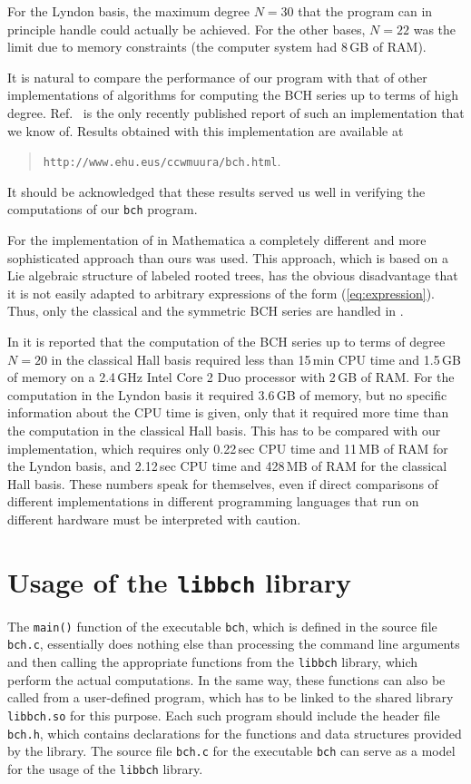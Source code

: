 \documentclass[11pt,a4paper]{article}
\begin{document}
For the Lyndon basis, the maximum degree $N=30$ that the program
can in principle handle could actually be achieved.
For the other bases, $N=22$ was the limit due to memory constraints
(the computer system had 8\,GB of RAM).

It is natural to compare the performance of our program with that
of other implementations of algorithms for computing the BCH series
up to terms of high degree.
Ref.~\cite{CasasMurua} is the only recently published report 
of such an implementation
that we know of. 
Results obtained with this implementation are available at 
\begin{quote}
\verb|http://www.ehu.eus/ccwmuura/bch.html|.
\end{quote}    
It should be acknowledged that these results served us well in verifying the computations of our \verb|bch| program.

For the implementation of \cite{CasasMurua} in {\sc Mathematica}
a completely different and  more sophisticated 
approach than ours was used. This approach, which is
based on a Lie algebraic structure of labeled rooted trees,
has the  obvious disadvantage  that
it is not easily adapted to arbitrary expressions 
of the form (\ref{eq:expression}). Thus, only the classical and the symmetric BCH series are handled in \cite{CasasMurua}.

In \cite{CasasMurua} it is reported  that the computation of the BCH series
up to terms of degree $N=20$ in the classical Hall basis required  less than
15\,min CPU time and 1.5\,GB of memory 
on a 2.4\,GHz Intel Core 2 Duo processor with 2\,GB of RAM.
For the computation in the Lyndon basis it required 3.6\,GB of memory, but no
specific information about the CPU time is given, only that
it required more time than the computation in the classical Hall basis.
This has to be compared with  our implementation, which  requires
only 0.22\,sec CPU time and 11\,MB of RAM for the Lyndon basis, 
and 2.12\,sec CPU time and 428\,MB of RAM for the classical Hall basis.
These numbers speak for themselves, even if  direct comparisons 
of different implementations in different programming languages that run on different hardware 
must be interpreted with caution.

\section{Usage of the {\tt libbch} library}
The \verb|main()| function 
of  the executable \verb|bch|, which is
defined in the source file \verb|bch.c|, essentially does nothing else
than processing the command line arguments and then calling 
the appropriate functions from the \verb|libbch| library, which
perform the actual computations.
In the same way, these functions can also be called from a user-defined program,
which has to be linked to the 
shared library \verb|libbch.so| for this purpose.
Each such program should include the header file
\verb|bch.h|, which contains declarations 
for the functions and data structures provided by the library.
The source file \verb|bch.c| for the executable \verb|bch| can serve as a model for
the usage of the  \verb|libbch| library.
\end{document}
